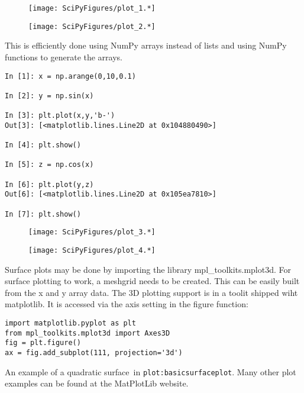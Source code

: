 \begin{figure}
\centering
\texttt{[image: SciPyFigures/plot\_1.*]}
\caption{}
\end{figure}

\begin{figure}
\centering
\texttt{[image: SciPyFigures/plot\_2.*]}
\caption{}
\end{figure}

This is efficiently done using NumPy arrays instead of lists and using
NumPy functions to generate the arrays.

\begin{verbatim}
In [1]: x = np.arange(0,10,0.1)

In [2]: y = np.sin(x)

In [3]: plt.plot(x,y,'b-')
Out[3]: [<matplotlib.lines.Line2D at 0x104880490>]

In [4]: plt.show()

In [5]: z = np.cos(x)

In [6]: plt.plot(y,z)
Out[6]: [<matplotlib.lines.Line2D at 0x105ea7810>]

In [7]: plt.show()
\end{verbatim}

\begin{figure}
\centering
\texttt{[image: SciPyFigures/plot\_3.*]}
\caption{}
\end{figure}

\begin{figure}
\centering
\texttt{[image: SciPyFigures/plot\_4.*]}
\caption{}
\end{figure}

Surface plots may be done by importing the library
mpl\_toolkits.mplot3d. For surface plotting to work, a meshgrid needs to
be created. This can be easily built from the x and y array data. The 3D
plotting support is in a toolit shipped wiht matplotlib. It is accessed
via the axis setting in the figure function:

\begin{verbatim}
import matplotlib.pyplot as plt
from mpl_toolkits.mplot3d import Axes3D
fig = plt.figure()
ax = fig.add_subplot(111, projection='3d')
\end{verbatim}

An example of a quadratic surface~in \texttt{plot:basicsurfaceplot}.
Many other plot examples can be found at the MatPlotLib website.

